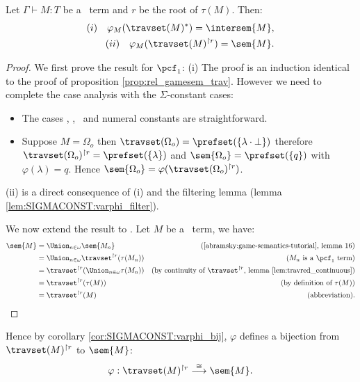 \begin{prop}
Let $\Gamma \vdash M : T$ be a \pcf\ term and $r$ be the root of $\tau(M)$. Then:
\begin{align*}
(i)  \quad\varphi_M(\travset(M)^*) = \intersem{M},  \\
(ii) \quad \varphi_M(\travset(M)^{\upharpoonright r}) = \sem{M}.
\end{align*}
\end{prop}
\begin{proof}
We first prove the result for $\pcf_1$:
(i) The proof is an induction identical to the proof of proposition \ref{prop:rel_gamesem_trav}. However we need
to complete the case analysis with the $\Sigma$-constant cases:
\begin{itemize}
\item The cases \pcfsucc, \pcfpred, \pcfcond\ and numeral constants are straightforward.

\item Suppose $M = \Omega_o$ then $\travset(\Omega_o) = \prefset ( \{ \lambda \cdot \bot \} )$ therefore
$\travset(\Omega_o)^{\upharpoonright r} = \prefset( \{ \lambda \} )$
and $\sem{\Omega_o} = \prefset( \{ q \})$ with $\varphi(\lambda) = q$. Hence $\sem{\Omega_o} = \varphi (\travset(\Omega_o)^{\upharpoonright r})$.
\end{itemize}
(ii) is a direct consequence of (i) and the filtering lemma (lemma \ref{lem:SIGMACONST:varphi_filter}).
\vspace{10pt}

\noindent We now extend the result to \pcf.
Let $M$ be a \pcf\ term, we have:
\begin{align*}
\sem{M} &= \Union_{n\in\omega} \sem{M_n} & (\mbox{\cite{abramsky:game-semantics-tutorial}, lemma 16})\\
&= \Union_{n\in\omega} \travset^{\upharpoonright r}(\tau(M_n)) & (M_n \mbox{ is a $\pcf_1$ term}) \\
&= \travset^{\upharpoonright r}(\Union_{n\in\omega} \tau(M_n) ) & (\mbox{by continuity of $\travset^{\upharpoonright r}$, lemma \ref{lem:travred_continuous}}) \\
&= \travset^{\upharpoonright r}(\tau(M)) & (\mbox{by definition of } \tau(M)) \\
&= \travset^{\upharpoonright r}(M) & (\mbox{abbreviation}).
\end{align*}
\end{proof}

Hence by corollary \ref{cor:SIGMACONST:varphi_bij}, $\varphi$ defines a bijection from
$\travset(M)^{\upharpoonright r}$ to $\sem{M}$:
$$\varphi : \travset(M)^{\upharpoonright r} \stackrel{\cong}{\longrightarrow} \sem{M}.$$

